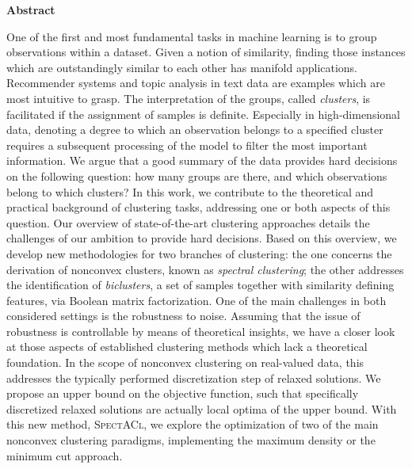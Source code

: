\thispagestyle{plain}
\bigskip
\begin{center}
	\Large
    \textbf{Abstract}
\end{center}
One of the first and most fundamental tasks in machine learning is to group observations within a dataset. Given a notion of similarity, finding those instances which are outstandingly similar to each other has manifold applications. Recommender systems and topic analysis in text data are examples which are most intuitive to grasp. The interpretation of the groups, called \emph{clusters}, is facilitated if the assignment of samples is definite. Especially in high-dimensional data, denoting a degree to which an observation belongs to a specified cluster requires a subsequent processing of the model to filter the most important information. We argue that a good summary of the data provides hard decisions on the following question: how many groups are there, and which observations belong to which clusters? In this work, we contribute to the theoretical and practical background of clustering tasks, addressing one or both aspects of this question. Our overview of state-of-the-art clustering approaches details the challenges of our ambition to provide hard decisions. Based on this overview, we develop new methodologies for two branches of clustering: the one concerns the derivation of nonconvex clusters, known as \emph{spectral clustering}; the other addresses the identification of \emph{biclusters}, a set of samples together with similarity defining features, via Boolean matrix factorization. 
One of the main challenges in both considered settings is the robustness to noise. Assuming that the issue of robustness is controllable by means of theoretical insights, we have a closer look at those aspects of established clustering methods which lack a theoretical foundation. In the scope of nonconvex clustering on real-valued data, this addresses the typically performed discretization step of relaxed solutions. We propose an upper bound on the objective function, such that specifically discretized relaxed solutions are actually local optima of the upper bound. With this new method, \textsc{SpectACl}, we explore the optimization of two of the main nonconvex clustering paradigms, implementing the maximum density or the minimum cut approach. 
